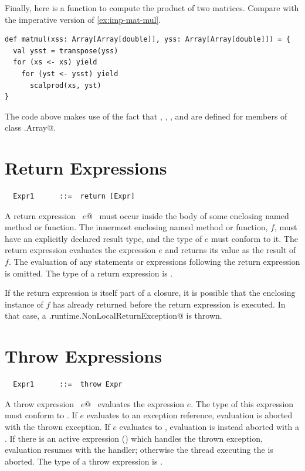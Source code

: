 Finally, here is a function to compute the product of two matrices. 
Compare with the imperative version of \ref{ex:imp-mat-mul}.
\begin{lstlisting}
def matmul(xss: Array[Array[double]], yss: Array[Array[double]]) = {
  val ysst = transpose(yss) 
  for (xs <- xs) yield
    for (yst <- ysst) yield 
      scalprod(xs, yst)
}
\end{lstlisting}
The code above makes use of the fact that , ,
, and  are defined for members of class
\lstinline@scala.Array@.

\section{Return Expressions}

\syntax\begin{lstlisting}
  Expr1      ::=  return [Expr]
\end{lstlisting}

A return expression ~\lstinline@return $e$@~ must occur inside the body of some
enclosing named method or function. The innermost enclosing named
method or function, $f$, must have an explicitly declared result type,
and the type of $e$ must conform to it.  The return expression
evaluates the expression $e$ and returns its value as the result of
$f$. The evaluation of any statements or
expressions following the return expression is omitted. The type of 
a return expression is .

If the return expression is itself part of a closure, it is possible
that the enclosing instance of $f$ has already returned before the
return expression is executed. In that case, a 
\lstinline@scala.runtime.NonLocalReturnException@ is thrown.

\section{Throw Expressions}

\syntax\begin{lstlisting}
  Expr1      ::=  throw Expr
\end{lstlisting}

A throw expression ~\lstinline@throw $e$@~ evaluates the expression
$e$. The type of this expression must conform to
.  If $e$ evaluates to an exception
reference, evaluation is aborted with the thrown exception. If $e$
evaluates to , evaluation is instead aborted with a
. If there is an active
 expression () which handles the thrown
exception, evaluation resumes with the handler; otherwise the thread
executing the  is aborted.  The type of a throw expression
is .

